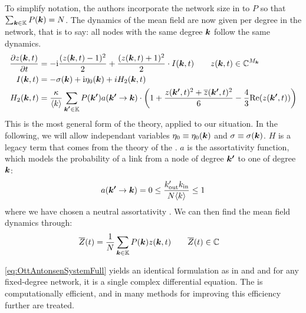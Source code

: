 To simplify notation, the authors incorporate the network size in to $P$ so that $\sum_{{\boldsymbol{k}} \in {\mathbb{K}}} P({\boldsymbol{k}}) = N$. The dynamics of the mean field are now given per degree in the network, that is to say: all nodes with the same degree ${\boldsymbol{k}}$ follow the same dynamics.
\begin{align}
\frac{\partial z(\k, t)}{\partial t} &= -\ic \frac{(z(\k, t)-1)^{2}}{2} + \frac{(z(\k, t)+1)^{2}}{2} \cdot I(\k, t) \qquad z(\k,t) \in \C^{M_\k} \nonumber \\
I(\k, t) &= -\sigma(\k) + \ic \eta_{0}(\k) + i H_2(\k,t) \label{eq:OttAntonsenSystemFull} \\
H_2(\k,t) &= \frac{\kappa}{\kmean} \sum_{\kacc \in \K} P\left(\kacc\right) a\left(\kacc \rightarrow \k\right) \cdot \left( 1 + \frac{z(\kacc, t)^2 + \overline{z}(\kacc, t)^2}{6} - \frac{4}{3} \Re(z(\kacc, t)) \right) \nonumber
\end{align}
This is the most general form of the theory, applied to our situation. In the following, we will allow independant variables $\eta_0 \equiv \eta_0({\boldsymbol{k}})$ and $\sigma \equiv \sigma({\boldsymbol{k}})$. $H$ is a legacy term that comes from the theory of the \MFR. $a$ is the assortativity function, which models the probability of a link from a node of degree ${\boldsymbol{k'}}$ to one of degree ${\boldsymbol{k}}$:
\begin{align}
a\left(\kacc \rightarrow \k\right) = 0 \leq \frac{k_{\text{out}}^{\prime} k_{\text{in}}}{N \kmean} \leq 1 \label{eq:assortativityfunction}
\end{align}
where we have chosen a neutral assortativity \cite{OttAntonsen2017}. We can then find the mean field dynamics through:
\begin{align}
\overline{Z}(t) &= \frac{1}{N} \sum_{{\boldsymbol{k}} \in {\mathbb{K}}} P({\boldsymbol{k}}) z({\boldsymbol{k}}, t) \qquad \overline{Z}(t) \in {\mathbb{C}} \label{eq:OttAntonsenMeanField}
\end{align}

\eqref{eq:OttAntonsenSystemFull} yields an identical formulation as in \cite{Luke2013} and \cite{Martens2020} and for any fixed-degree network, it is a single complex differential equation. The \MFR is computationally efficient, and in \cite{OttAntonsen2017} many methods for improving this efficiency further are treated.

